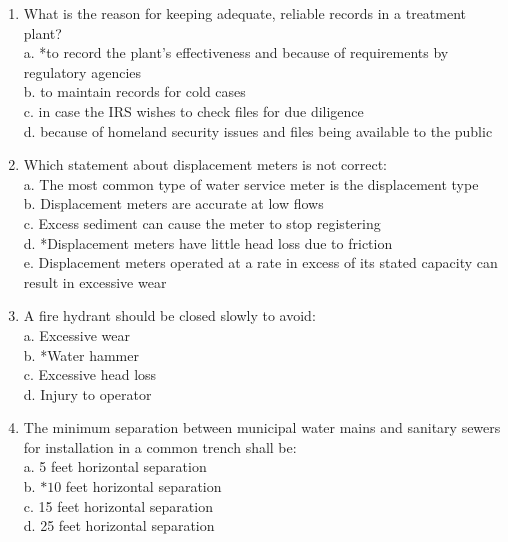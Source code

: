 
\begin{enumerate}[1.]


\item What is the reason for keeping adequate, reliable records in a treatment plant?\\
a. *to record the plant's effectiveness and because of requirements by regulatory agencies\\
b. to maintain records for cold cases\\
c. in case the IRS wishes to check files for due diligence\\
d. because of homeland security issues and files being available to the public\\
\item Which statement about displacement meters is not correct:\\
a. The most common type of water service meter is the displacement type\\
b. Displacement meters are accurate at low flows\\
c. Excess sediment can cause the meter to stop registering\\
d. *Displacement meters have little head loss due to friction\\
e. Displacement meters operated at a rate in excess of its stated capacity can result in excessive wear\\
\item A fire hydrant should be closed slowly to avoid:\\
a. Excessive wear\\
b. *Water hammer\\
c. Excessive head loss\\
d. Injury to operator\\
\item The minimum separation between municipal water mains and sanitary sewers for installation in a common trench shall be:\\
a. 5 feet horizontal separation\\
b. $* 10$ feet horizontal separation\\
c. 15 feet horizontal separation\\
d. 25 feet horizontal separation\\

\end{enumerate}
